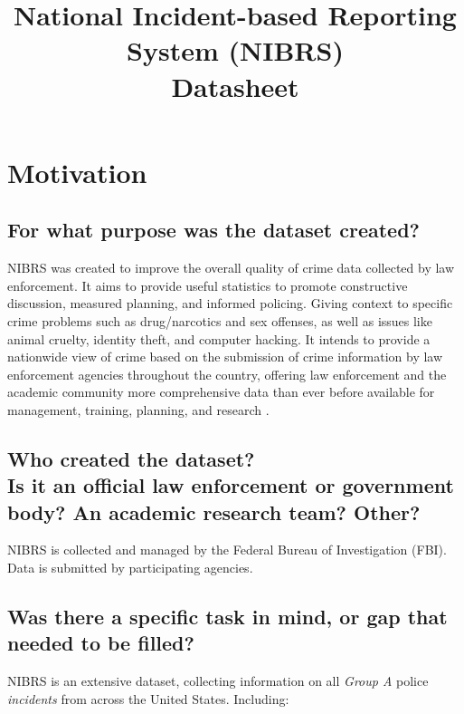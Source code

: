 \documentclass[letterpaper, 10 pt, conference]{ieeeconf}  %
\title{\LARGE \bf
National Incident-based Reporting System (NIBRS) \\{\color{blue}Datasheet}
}
\newcommand{\subtitle}[1]{{\\ \small \normalfont \color{purple} #1}}
\begin{document}
\maketitle
\thispagestyle{empty}
\pagestyle{empty}

\section{Motivation}

\subsection{For what purpose was the dataset created?}

NIBRS was created to improve the overall quality of crime data collected by law enforcement. It aims to provide useful statistics to promote constructive discussion, measured planning, and informed policing. Giving context to specific crime problems such as drug/narcotics and sex offenses, as well as issues like animal cruelty, identity theft, and computer hacking. It intends to provide a nationwide view of crime based on the submission of crime information by law enforcement agencies throughout the country, offering law enforcement and the academic community more comprehensive data than ever before available for management, training, planning, and research \cite{federal2020national}.

\subsection{Who created the dataset? \subtitle{Is it an official law enforcement or government body? An academic research team? Other?}}

NIBRS is collected and managed by the Federal Bureau of Investigation (FBI). Data is submitted by participating agencies.

\subsection{Was there a specific task in mind, or gap that needed to be filled?}

NIBRS is an extensive dataset, collecting information on all \textit{Group A} police \textit{incidents} from across the United States. Including:
\end{document}
